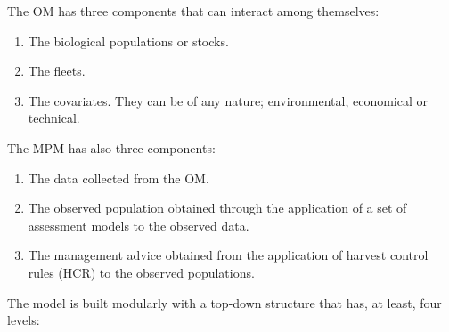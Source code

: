 The OM has three components that can interact among themselves:

\begin{enumerate}
	\item The biological populations or stocks.
  \item The fleets. 
  \item The covariates. They can be of any nature; environmental, economical or technical.
\end{enumerate}

The MPM has also three components:
\begin{enumerate}
	\item The data collected from the OM. 
  \item The observed population obtained through the application of a set of assessment models to the observed data. 
  \item The management advice obtained from the application of harvest control rules (HCR) to the observed populations.
\end{enumerate}
 

The model is built modularly with a top-down structure that has, at least, four levels:
 
